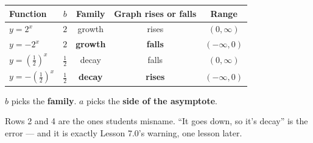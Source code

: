 \documentclass[aspectratio=169, 11pt]{beamer}
\begin{document}
\begin{frame}[t, plain]
  \begin{center}
  \footnotesize
  \renewcommand{\arraystretch}{1.4}
  \begin{tabular}{|l|c|c|c|c|}
  \hline
  \textbf{Function} & \textbf{$b$} & \textbf{Family} & \textbf{Graph rises or falls} & \textbf{Range} \\
  \hline
  $y=2^{x}$ & $2$ & growth & rises & $(0,\infty)$ \\
  $y=-2^{x}$ & $2$ & \textbf{growth} & \textbf{falls} & $(-\infty,0)$ \\
  $y=\left(\frac12\right)^{x}$ & $\frac12$ & decay & falls & $(0,\infty)$ \\
  $y=-\left(\frac12\right)^{x}$ & $\frac12$ & \textbf{decay} & \textbf{rises} & $(-\infty,0)$ \\
  \hline
  \end{tabular}
  \end{center}
  \vspace{8pt}
  \begin{center}
    \Large $b$ picks the \textbf{family}. \quad $a$ picks the \textbf{side of the asymptote}.
  \end{center}
  \vspace{6pt}
  \begin{center}
    {\footnotesize Rows 2 and 4 are the ones students misname. ``It goes down, so it's decay'' is the
    error --- and it is exactly Lesson 7.0's warning, one lesson later.}
  \end{center}
\end{frame}
\end{document}
